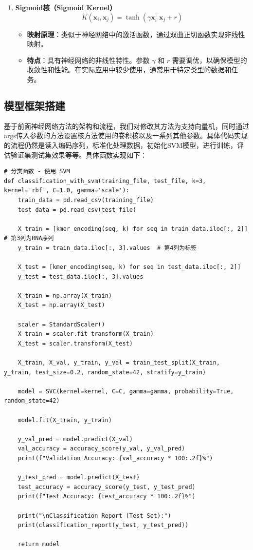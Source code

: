 \documentclass[a4paper,11pt,AutoFakeBold]{ctexart}
\begin{document}
\begin{enumerate}
    \item \textbf{Sigmoid核（Sigmoid Kernel）}
    \begin{equation}
    K(\mathbf{x}_i, \mathbf{x}_j) = \tanh(\gamma \mathbf{x}_i^\top \mathbf{x}_j + r)
    \end{equation}
    \begin{itemize}
        \item \textbf{映射原理}：类似于神经网络中的激活函数，通过双曲正切函数实现非线性映射。
        \item \textbf{特点}：具有神经网络的非线性特性。参数 $\gamma$ 和 $r$ 需要调优，以确保模型的收敛性和性能。在实际应用中较少使用，通常用于特定类型的数据和任务。
    \end{itemize}
\end{enumerate}

\subsection{模型框架搭建}
基于前面神经网络方法的架构和流程，我们对修改其方法为支持向量机，同时通过args传入参数的方法设置核方法使用的卷积核以及一系列其他参数。具体代码实现的流程仍然是读入编码序列，标准化处理数据，初始化SVM模型，进行训练，评估验证集测试集效果等等。具体函数实现如下：

\begin{lstlisting}
# 分类函数 - 使用 SVM
def classification_with_svm(training_file, test_file, k=3, kernel='rbf', C=1.0, gamma='scale'):
    train_data = pd.read_csv(training_file)
    test_data = pd.read_csv(test_file)

    X_train = [kmer_encoding(seq, k) for seq in train_data.iloc[:, 2]]  # 第3列为RNA序列
    y_train = train_data.iloc[:, 3].values  # 第4列为标签
    
    X_test = [kmer_encoding(seq, k) for seq in test_data.iloc[:, 2]]
    y_test = test_data.iloc[:, 3].values
    
    X_train = np.array(X_train)
    X_test = np.array(X_test)

    scaler = StandardScaler()
    X_train = scaler.fit_transform(X_train)
    X_test = scaler.transform(X_test)
    
    X_train, X_val, y_train, y_val = train_test_split(X_train, y_train, test_size=0.2, random_state=42, stratify=y_train)
    
    model = SVC(kernel=kernel, C=C, gamma=gamma, probability=True, random_state=42)

    model.fit(X_train, y_train)

    y_val_pred = model.predict(X_val)
    val_accuracy = accuracy_score(y_val, y_val_pred)
    print(f"Validation Accuracy: {val_accuracy * 100:.2f}%")
    
    y_test_pred = model.predict(X_test)
    test_accuracy = accuracy_score(y_test, y_test_pred)
    print(f"Test Accuracy: {test_accuracy * 100:.2f}%")

    print("\nClassification Report (Test Set):")
    print(classification_report(y_test, y_test_pred))
    
    return model
\end{lstlisting}
\end{document}
